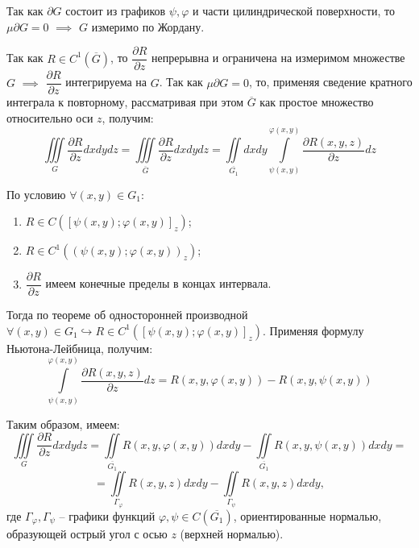\documentclass[12pt, a4paper, reqno]{article}
\begin{document}
    Так как $\partial G$ состоит из графиков $\psi, \varphi$ и части цилиндрической поверхности,
    то $\mu\partial G = 0$ $\implies$ $G$ измеримо по Жордану.

    Так как $R \in C^1(\overline{G})$, то $\dfrac{\partial R}{\partial z}$ непрерывна и ограничена
    на измеримом множестве $G$ $\implies$ $\dfrac{\partial R}{\partial z}$ интегрируема на
    $G$. Так как $\mu\partial G = 0$, то, применяя сведение кратного интеграла к повторному,
    рассматривая при этом $\overline{G}$ как простое множество относительно оси $z$, получим:
    \begin{equation*}
        \iiint\limits_{G}\frac{\partial R}{\partial z} dx dy dz =
        \iiint\limits_{\overline{G}}\frac{\partial R}{\partial z} dx dy dz =
        \iint\limits_{\overline{G_1}}dx dy \int\limits_{\psi(x, y)}^{\varphi(x, y)}
        \frac{\partial R(x, y, z)}{\partial z}dz
    \end{equation*}

    По условию $\forall (x, y) \in G_1$:
    \begin{enumerate}
        \item $R \in C([\psi(x, y); \varphi(x, y)]_z)$;
        \item $R \in C^1((\psi(x, y); \varphi(x, y))_z)$;
        \item $\dfrac{\partial R}{\partial z}$ имеем конечные пределы в концах интервала.
    \end{enumerate}

    Тогда по теореме об односторонней производной
    $\forall (x, y) \in G_1 \hookrightarrow R \in C^1([\psi(x, y); \varphi(x, y)]_z)$.
    Применяя формулу Ньютона-Лейбница, получим:
    \begin{equation*}
        \int\limits_{\psi(x, y)}^{\varphi(x, y)}\frac{\partial R(x, y, z)}{\partial z}dz =
        R(x, y, \varphi(x, y)) - R(x, y, \psi(x, y))
    \end{equation*}

    Таким образом, имеем:
    \begin{equation*}
        \iiint\limits_{G}\frac{\partial R}{\partial z} dx dy dz =
        \iint\limits_{\overline{G_1}} R(x, y, \varphi(x, y)) dx dy -
        \iint\limits_{\overline{G_1}} R(x, y, \psi(x, y)) dx dy =
    \end{equation*}
    \begin{equation*}
        = \iint\limits_{\Gamma_{\varphi}} R(x, y, z) dx dy -
        \iint\limits_{\Gamma_{\psi}} R(x, y, z) dx dy,
    \end{equation*}
    где $\Gamma_{\varphi}, \Gamma_{\psi}$ -- графики функций $\varphi, \psi \in C(\overline{G_1})$,
    ориентированные нормалью, образующей острый угол с осью $z$ (верхней нормалью).
\end{document}
